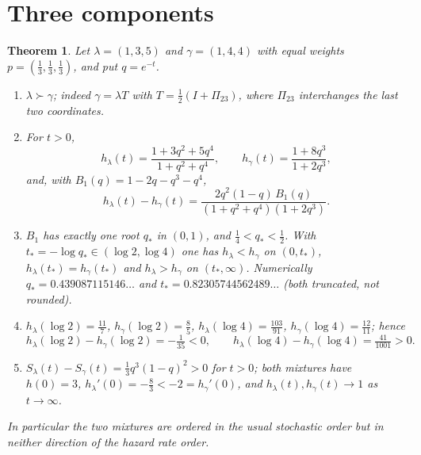 \documentclass[10pt]{article}
\theoremstyle{plain}
\newtheorem{theorem}{Theorem}[section]
\theoremstyle{definition}
\theoremstyle{remark}
\begin{document}
\section{Three components}\label{sec:three}

\begin{theorem}\label{thm:three}
Let $\lambda=(1,3,5)$ and $\gamma=(1,4,4)$ with equal weights $p=(\tfrac13,\tfrac13,\tfrac13)$, and put $q=e^{-t}$.
\begin{enumerate}
\item[(a)] $\lambda\succ\gamma$; indeed $\gamma=\lambda T$ with $T=\tfrac12(I+\Pi_{23})$, where $\Pi_{23}$ interchanges the last two coordinates.
\item[(b)] For $t>0$,
\begin{equation}\label{eq:three}
h_\lambda(t)=\frac{1+3q^2+5q^4}{1+q^2+q^4},\qquad
h_\gamma(t)=\frac{1+8q^3}{1+2q^3},
\end{equation}
and, with $B_1(q)=1-2q-q^3-q^4$,
\begin{equation}\label{eq:threediff}
h_\lambda(t)-h_\gamma(t)=\frac{2q^2(1-q)\,B_1(q)}{(1+q^2+q^4)(1+2q^3)} .
\end{equation}
\item[(c)] $B_1$ has exactly one root $q_*$ in $(0,1)$, and $\tfrac14<q_*<\tfrac12$. With $t_*=-\log q_*\in(\log 2,\log 4)$ one has $h_\lambda<h_\gamma$ on $(0,t_*)$, $h_\lambda(t_*)=h_\gamma(t_*)$ and $h_\lambda>h_\gamma$ on $(t_*,\infty)$. Numerically $q_*=0.439087115146\ldots$ and $t_*=0.82305744562489\ldots$ (both truncated, not rounded).
\item[(d)] $h_\lambda(\log 2)=\tfrac{11}{7}$, $h_\gamma(\log 2)=\tfrac85$, $h_\lambda(\log 4)=\tfrac{103}{91}$, $h_\gamma(\log 4)=\tfrac{12}{11}$; hence
\[
h_\lambda(\log 2)-h_\gamma(\log 2)=-\tfrac{1}{35}<0,\qquad h_\lambda(\log 4)-h_\gamma(\log 4)=\tfrac{41}{1001}>0 .
\]
\item[(e)] $S_\lambda(t)-S_\gamma(t)=\tfrac13 q^3(1-q)^2>0$ for $t>0$; both mixtures have $h(0)=3$, $h_\lambda'(0)=-\tfrac83<-2=h_\gamma'(0)$, and $h_\lambda(t),h_\gamma(t)\to 1$ as $t\to\infty$.
\end{enumerate}
In particular the two mixtures are ordered in the usual stochastic order but in neither direction of the hazard rate order.
\end{theorem}
\end{document}
